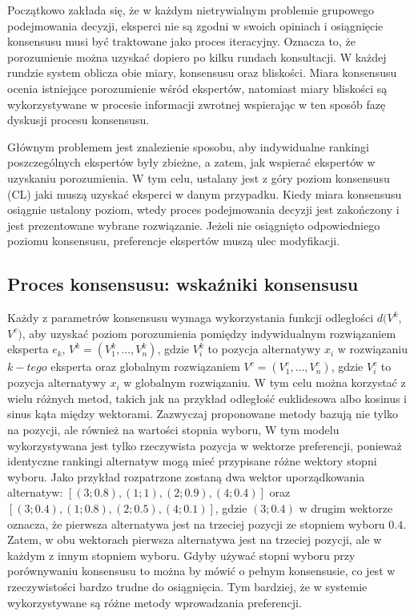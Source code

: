 Początkowo zakłada się, że w każdym nietrywialnym problemie grupowego
podejmowania decyzji, eksperci nie są zgodni w swoich opiniach i osiągnięcie
konsensusu musi być traktowane jako proces iteracyjny. Oznacza to, że
porozumienie można uzyskać dopiero po kilku rundach konsultacji. W każdej
rundzie system oblicza obie miary, konsensusu oraz bliskości. Miara konsensusu
ocenia istniejące porozumienie wśród ekspertów, natomiast miary bliskości są
wykorzystywane w procesie informacji zwrotnej wspierając w ten sposób fazę
dyskusji procesu konsensusu.

Głównym problemem jest znalezienie sposobu, aby indywidualne rankingi
poszczególnych ekspertów były zbieżne, a zatem, jak wspierać ekspertów w
uzyskaniu porozumienia. W tym celu, ustalany jest z góry poziom konsensusu (CL)
jaki muszą uzyskać eksperci w danym przypadku. Kiedy miara konsensusu osiągnie
ustalony poziom, wtedy proces podejmowania decyzji jest zakończony i jest
prezentowane wybrane rozwiązanie. Jeżeli nie osiągnięto odpowiedniego poziomu
konsensusu, preferencje ekspertów muszą ulec modyfikacji.

\subsection{Proces konsensusu: wskaźniki konsensusu}
Każdy z parametrów konsensusu wymaga wykorzystania funkcji odległości
$d(V^k,$ $V^c)$, aby uzyskać poziom porozumienia pomiędzy indywidualnym
rozwiązaniem eksperta $e_k$, $V^k = (V^k_1, \dotsc, V^k_n)$, gdzie $V^k_i$ to
pozycja alternatywy $x_i$ w rozwiązaniu $k-tego$ eksperta oraz globalnym
rozwiązaniem $V^c = (V^c_1, \dotsc, V^c_n)$, gdzie $V^c_i$ to pozycja
alternatywy $x_i$ w globalnym rozwiązaniu. W tym celu można korzystać z wielu
różnych metod, takich jak na przykład odległość euklidesowa albo kosinus i sinus
kąta między wektorami. Zazwyczaj proponowane metody bazują nie tylko na pozycji,
ale również na wartości stopnia wyboru, W tym modelu wykorzystywana jest
tylko rzeczywista pozycja w wektorze preferencji, ponieważ identyczne rankingi
alternatyw mogą mieć przypisane różne wektory stopni wyboru. Jako przykład
rozpatrzone zostaną dwa wektor uporządkowania alternatyw: $[(3;0.8), (1;1),
(2;0.9), (4;0.4)]$ oraz $[(3;0.4), (1;0.8), (2;0.5), (4;0.1)]$, gdzie $(3; 0.4)$
w drugim wektorze oznacza, że pierwsza alternatywa jest na trzeciej pozycji ze
stopniem wyboru $0.4$. Zatem, w obu wektorach pierwsza alternatywa jest na
trzeciej pozycji, ale w każdym z innym stopniem wyboru. Gdyby używać stopni
wyboru przy porównywaniu konsensusu to można by mówić o pełnym konsensusie, co
jest w rzeczywistości bardzo trudne do osiągnięcia. Tym bardziej, że w systemie
wykorzystywane są różne metody wprowadzania preferencji.

